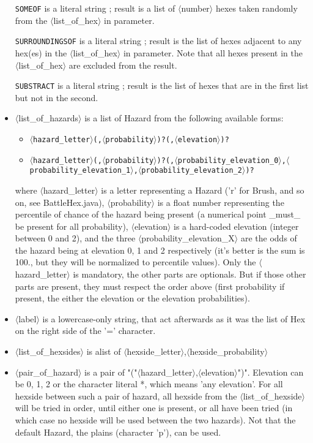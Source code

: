 \documentclass{article}
\begin{document}
\begin{itemize}
 \texttt{SOMEOF} is a literal string ; result is a list of $\langle$number$\rangle$ hexes taken
 randomly from the $\langle$list\_of\_hex$\rangle$ in parameter.

 \texttt{SURROUNDINGSOF} is a literal string ; result is the list of hexes
 adjacent to any hex(es) in the $\langle$list\_of\_hex$\rangle$ in parameter. Note that
 all hexes present in the $\langle$list\_of\_hex$\rangle$ are excluded from the result.

 \texttt{SUBSTRACT} is a literal string ; result is the list of hexes that
 are in the first list but not in the second.

\item $\langle$list\_of\_hazards$\rangle$ is a list of Hazard from the following available forms:
\begin{itemize}
\item \texttt{$\langle$hazard\_letter$\rangle$(,$\langle$probability$\rangle$)?(,$\langle$elevation$\rangle$)?}
\item \texttt{$\langle$hazard\_letter$\rangle$(,$\langle$probability$\rangle$)?(,$\langle$probability\_elevation\_0$\rangle$,$\langle$probability\_elevation\_1$\rangle$,$\langle$probability\_elevation\_2$\rangle$)?}
\end{itemize}

 where $\langle$hazard\_letter$\rangle$ is a letter representing a
 Hazard ('r' for Brush, and so on, see BattleHex.java), $\langle$probability$\rangle$ is a float number
 representing the percentile of chance of the hazard being present
 (a numerical point \_must\_ be present for all probability), $\langle$elevation$\rangle$
 is a hard-coded elevation (integer between 0 and 2), and the three
 $\langle$probability\_elevation\_X$\rangle$ are the odds of the hazard being at elevation
 0, 1 and 2 respectively (it's better is the sum is 100., but they will
 be normalized to percentile values).
 Only the $\langle$hazard\_letter$\rangle$ is mandatory, the other parts are optionals.
 But if those other parts are present, they must respect the order
 above (first probability if present, the either the elevation or
 the elevation probabilities).

\item $\langle$label$\rangle$ is a lowercase-only string, that act afterwards as it was the list of
 Hex on the right side of the '=' character.

\item $\langle$list\_of\_hexsides$\rangle$ is alist of $\langle$hexside\_letter$\rangle$,$\langle$hexside\_probability$\rangle$

\item $\langle$pair\_of\_hazard$\rangle$ is a pair of "("$\langle$hazard\_letter$\rangle$,$\langle$elevation$\rangle$")". Elevation
 can be 0, 1, 2 or the character literal *, which means 'any elevation'.
 For all hexside between such a pair of hazard, all hexside from the
 $\langle$list\_of\_hexside$\rangle$ will be tried in order, until either one is
 present, or all have been tried (in which case no hexside will be
 used between the two hazards). Not that the default Hazard, the
 plains (character 'p'), can be used.

\end{itemize}
\end{document}
